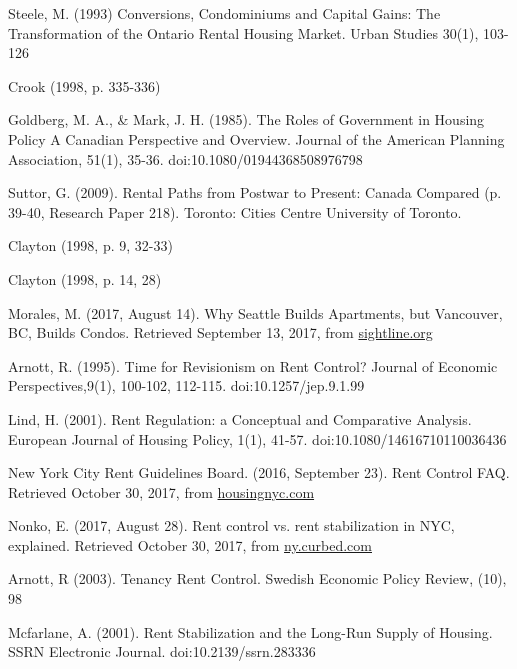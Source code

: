 \begin{thebibliography}{9}
  Steele, M. (1993) Conversions, Condominiums and Capital Gains: The Transformation of the Ontario Rental Housing Market. Urban Studies 30(1), 103-126

 Crook (1998, p. 335-336)

 Goldberg, M. A., \& Mark, J. H. (1985). The Roles of Government in Housing Policy A Canadian Perspective and Overview. Journal of the American Planning Association, 51(1), 35-36. doi:10.1080/01944368508976798

 Suttor, G. (2009). Rental Paths from Postwar to Present: Canada Compared (p. 39-40, Research Paper 218). Toronto: Cities Centre University of Toronto.

 Clayton (1998, p. 9, 32-33)
  

 Clayton (1998, p. 14, 28) 

  Morales, M. (2017, August 14). Why Seattle Builds Apartments, but Vancouver, BC, Builds Condos. Retrieved September 13, 2017, from \href{http://www.sightline.org/2017/08/14/why-seattle-builds-apartments-but-vancouver-bc-builds-condos/}{sightline.org}


   Arnott, R. (1995). Time for Revisionism on Rent Control? Journal of Economic Perspectives,9(1), 100-102, 112-115. doi:10.1257/jep.9.1.99

  Lind, H. (2001). Rent Regulation: a Conceptual and Comparative Analysis. European Journal of Housing Policy, 1(1), 41-57. doi:10.1080/14616710110036436

  New York City Rent Guidelines Board. (2016, September 23). Rent Control FAQ. Retrieved October 30, 2017, from \href{http://www.housingnyc.com/html/resources/faq/rentcontrol.html}{housingnyc.com}

  Nonko, E. (2017, August 28). Rent control vs. rent stabilization in NYC, explained. Retrieved October 30, 2017, from \href{https://ny.curbed.com/2017/8/28/16214506/nyc-apartments-housing-rent-control}{ny.curbed.com}

  Arnott, R (2003). Tenancy Rent Control. Swedish Economic Policy Review, (10), 98

  Mcfarlane, A. (2001). Rent Stabilization and the Long-Run Supply of Housing. SSRN Electronic Journal. doi:10.2139/ssrn.283336


\end{thebibliography}
